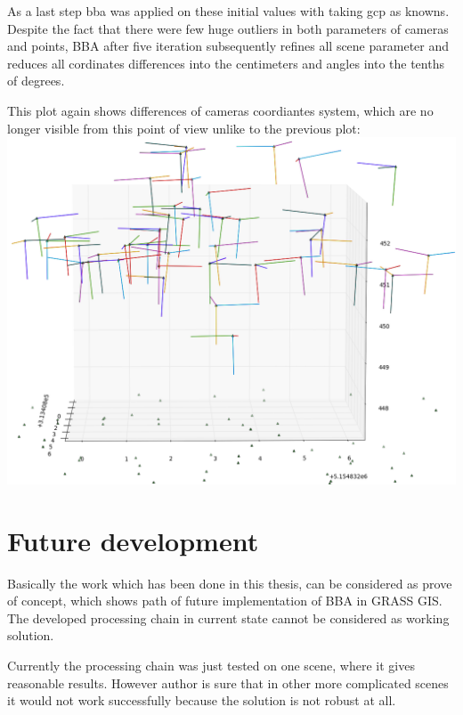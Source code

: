 \documentclass[a4paper,12pt]{article}
\begin{document}
As a last step bba was applied on these initial values with taking gcp as knowns.
Despite the fact that there were few huge outliers in both parameters of cameras and points,
BBA after five iteration subsequently refines all scene parameter and reduces all cordinates 
differences into the centimeters and angles into the tenths of degrees. 


This plot again shows differences of cameras coordiantes system, which are no longer visible from this point of view
unlike to the previous plot:
\includegraphics[scale=0.4]{figures/result.png}


\section{Future development}


Basically the work which has been done in this thesis, can be considered as prove of concept,
which shows path of future implementation of BBA in GRASS GIS. The developed 
processing chain in current state cannot be considered as working solution.

Currently  the processing chain was just tested 
 on one scene, where it gives reasonable results. However 
author is sure that in other more complicated scenes it would not work successfully because 
the solution is not robust at all.
\end{document}
